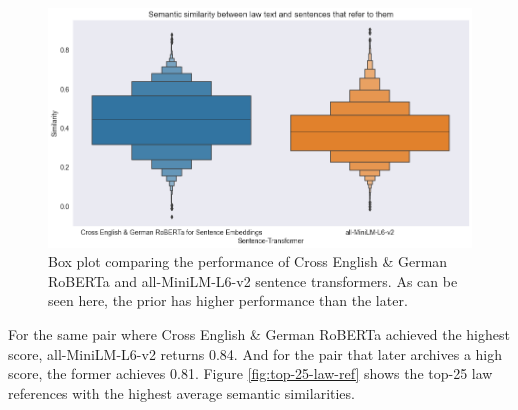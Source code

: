 \documentclass[runningheads]{llncs}
\begin{document}
\begin{figure}[h]
	\centering
	\includegraphics[width=0.9\linewidth]{images/box_sim.png}
	\caption{Box plot comparing the performance of Cross English \& German RoBERTa and all-MiniLM-L6-v2 sentence transformers. As can be seen here, the prior has higher performance than the later.}
	\label{fig:box_sim}
\end{figure}

For the same pair where Cross English \& German RoBERTa achieved the highest score, all-MiniLM-L6-v2 returns 0.84. And for the pair that later archives a high score, the former achieves 0.81. Figure \ref{fig:top-25-law-ref} shows the top-25 law references with the highest average semantic similarities.
\end{document}
